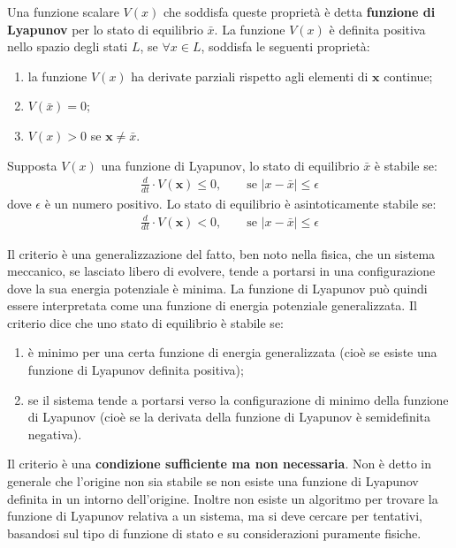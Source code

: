 Una funzione scalare $V(x)$ che soddisfa queste proprietà è detta \textbf{funzione di Lyapunov} per lo stato di equilibrio $\bar{x}$.
La funzione $V(x)$ è definita positiva nello spazio degli stati $L$, se $\forall x \in L$, soddisfa le seguenti proprietà:
\begin{enumerate}
	\item la funzione $V(x)$ ha derivate parziali rispetto agli elementi di $\mathbf{x}$ continue;
	\item $V(\bar{x})=0$;
	\item $V(x)>0$ se $\mathbf{x} \neq \bar{x}$.
\end{enumerate}

Supposta $V(x)$ una funzione di Lyapunov, lo stato di equilibrio $\bar{x}$ è stabile se:
\begin{align*}
	\frac{d}{dt} \cdot V(\mathbf{x}) \leq 0, \qquad \text{se } \left|x - \bar{x} \right| \leq \epsilon
\end{align*}
dove $\epsilon$ è un numero positivo. Lo stato di equilibrio è asintoticamente stabile se:
\begin{align*}
	\frac{d}{dt} \cdot V(\mathbf{x}) < 0, \qquad \text{se } \left|x - \bar{x} \right| \leq \epsilon
\end{align*}

Il criterio è una generalizzazione del fatto, ben noto nella fisica, che un sistema meccanico, se lasciato libero di evolvere, tende a portarsi in una configurazione dove la sua energia potenziale è minima. La funzione di Lyapunov può quindi essere interpretata come una funzione di energia potenziale generalizzata. Il criterio dice che uno stato di equilibrio è stabile se:
\begin{enumerate}
	\item è minimo per una certa funzione di energia generalizzata (cioè se esiste una funzione di Lyapunov definita positiva);
	\item se il sistema tende a portarsi verso la configurazione di minimo della funzione di Lyapunov (cioè se la derivata della funzione di Lyapunov è semidefinita negativa).
\end{enumerate}
Il criterio è una \textbf{condizione sufficiente ma non necessaria}. Non è detto in generale che l'origine non sia stabile se non esiste una funzione di Lyapunov definita in un intorno dell'origine. Inoltre non esiste un algoritmo per trovare la funzione di Lyapunov relativa a un sistema, ma si deve cercare per tentativi, basandosi sul tipo di funzione di stato e su considerazioni puramente fisiche.

